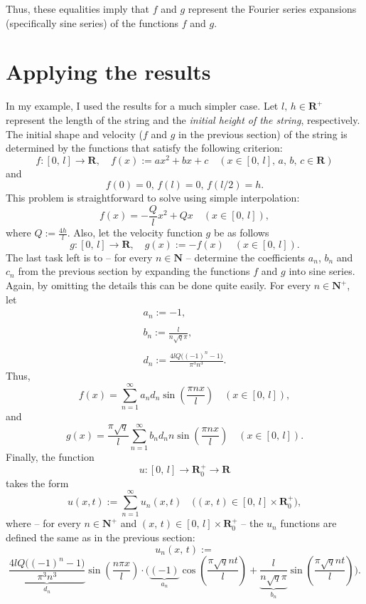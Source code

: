 \documentclass[12pt]{article}
\begin{document}
Thus, these equalities imply that $f$ and $g$ represent the Fourier series expansions (specifically sine series) of the functions $f$ and $g$.

\section{Applying the results}

In my example, I used the results for a much simpler case. Let $l, \, h \in \mathbf{R}^+$ represent the length of the string and the \textit{initial height of the string}, respectively. The initial shape and velocity ($f$ and $g$ in the previous section) of the string is determined by the functions that satisfy the following criterion:
$$
f : [0, \, l] \to \mathbf{R}, \quad f(x) := ax^2 + bx + c \quad (x \in [0, \, l], \, a, \, b, \, c \in \mathbf{R})
$$
and
$$
f(0) = 0, \, f(l) = 0, \, f(l/2) = h.
$$
This problem is straightforward to solve using simple interpolation:
$$
f(x) = - \frac{Q}{l}x^2 + Qx  \quad (x \in [0, \, l]),
$$
where $ Q := \frac{4h}{l} $. Also, let the velocity function $g$ be as follows
$$
g : [0, \, l] \to \mathbf{R}, \quad g(x) := -f(x) \quad (x \in [0, \, l]).
$$
The last task left is to -- for every $n \in \mathbf{N}$ -- determine the coefficients $a_n$, $b_n$ and $c_n$ from the previous section by expanding the functions $f$ and $g$ into sine series. Again, by omitting the details this can be done quite easily. For every $n \in \mathbf{N}^+$, let
$$
\begin{array}{ll}
	a_n := -1,\\
	\\
	b_n := \displaystyle \frac{l}{n \sqrt{q} \pi},\\
	\\
	d_n := \displaystyle \frac{4l Q\big( (-1)^n - 1 \big)}{\pi^3n^3}.
\end{array}
$$
Thus,
$$
f(x) = \sum_{n=1}^\infty a_n d_n \sin\left(\frac{\pi n x}{l}\right) \quad (x \in [0, \, l]),
$$
and
$$
g(x) = \frac{\pi \sqrt{q}}{l} \sum_{n=1}^\infty b_n d_n n \sin\left(\frac{\pi n x}{l}\right) \quad (x \in [0, \, l]).
$$
Finally, the function
$$
u : [0, \, l] \to \mathbf{R}^+_0 \to \mathbf{R}
$$
takes the form
$$
u(x, t) := \sum_{n=1}^\infty u_n(x, t) \quad \big((x, \, t) \in [0, \, l] \times \mathbf{R}_0^+ \big),
$$
where -- for every $n \in \mathbf{N}^+$ and $(x, \, t) \in [0, \, l] \times \mathbf{R}_0^+$ -- the $u_n$ functions are defined the same as in the previous section:
$$
	u_n(x, \, t) :=
$$
$$
 \underbrace{\frac{4l Q\big( (-1)^n - 1 \big)}{\pi^3n^3}}_{d_n} \sin\left(\frac{n \pi x}{l}\right) \cdot \Bigg(\underbrace{(-1)}_{a_n}\cos\left(\frac{\pi \sqrt{q} n t}{l}\right) + \underbrace{\frac{l}{n \sqrt{q} \pi}}_{b_n} \sin\left(\frac{\pi \sqrt{q} n t}{l}\right)\Bigg).
$$
\end{document}
